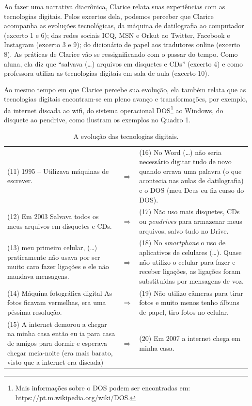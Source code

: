 \documentclass{textolivre-html}
\begin{document}
Ao fazer uma narrativa diacrônica, Clarice relata suas experiências com as tecnologias digitais. Pelos excertos dela, podemos perceber que Clarice acompanha as evoluções tecnológicas, da máquina de datilografia ao computador (excerto 1 e 6); das redes sociais ICQ, MSN e Orkut ao Twitter, Facebook e Instagram (excerto 3 e 9); do dicionário de papel aos tradutores online (excerto 8). As práticas de Clarice vão se ressignificando com o passar do tempo. Como aluna, ela diz que “salvava (\ldots) arquivos em disquetes e CDs” (excerto 4) e como professora utiliza as tecnologias digitais em sala de aula (excerto 10). 

Ao mesmo tempo em que Clarice percebe sua evolução, ela também relata que as tecnologias digitais encontram-se em pleno avanço e transformações, por exemplo, da internet discada ao wifi, do sistema operacional DOS\footnote{Mais informações sobre o DOS podem ser encontradas em: https://pt.m.wikipedia.org/wiki/DOS. } ao Windows, do disquete ao pendrive, como ilustram os exemplos no Quadro 1.

\begin{table}[htpb]
\caption{A evolução das tecnologias digitais.}
\label{tbl-tabela-01}
\begin{tabular}{p{}cp{}}
\toprule
(11) 1995 – Utilizava máquinas de escrever.  & $\Rightarrow$  & (16) No Word (\ldots) não seria necessário digitar tudo de novo quando errava uma palavra (o que acontecia nas aulas de datilografia) e o DOS (meu Deus eu fiz curso do DOS).  \\
(12) Em 2003 Salvava todos os meus arquivos em disquetes e CDs.  & $\Rightarrow$ & (17) Não uso mais disquetes, CDs ou \textit{pendrives} para armazenar meus arquivos, salvo tudo no Drive.\\
(13) meu primeiro celular, (\ldots) praticamente não usava por ser muito caro fazer ligações e ele não mandava mensagens.  & $\Rightarrow$ & (18) No \textit{smartphone} o uso de aplicativos de celulares (\ldots). Quase não utilizo o celular para fazer e receber ligações, as ligações foram substituídas por mensagens de voz. \\
(14) Máquina fotográfica digital As fotos ficavam vermelhas, era uma péssima resolução.  & $\Rightarrow$  & (19) Não utilizo câmeras para tirar fotos e muito menos tenho álbuns de papel, tiro fotos no celular.  \\
(15) A internet demorou a chegar na minha casa então eu ia para casa de amigos para dormir e esperava chegar meia-noite (era mais barato, visto que a internet era discada) & $\Rightarrow$ & (20) Em 2007 a internet chega em minha casa. \\
\bottomrule
\end{tabular}
\end{table}
\end{document}
